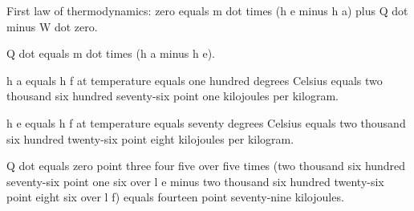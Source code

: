 First law of thermodynamics: zero equals m dot times (h e minus h a) plus Q dot minus W dot zero.

Q dot equals m dot times (h a minus h e).

h a equals h f at temperature equals one hundred degrees Celsius equals two thousand six hundred seventy-six point one kilojoules per kilogram.

h e equals h f at temperature equals seventy degrees Celsius equals two thousand six hundred twenty-six point eight kilojoules per kilogram.

Q dot equals zero point three four five over five times (two thousand six hundred seventy-six point one six over l e minus two thousand six hundred twenty-six point eight six over l f) equals fourteen point seventy-nine kilojoules.
